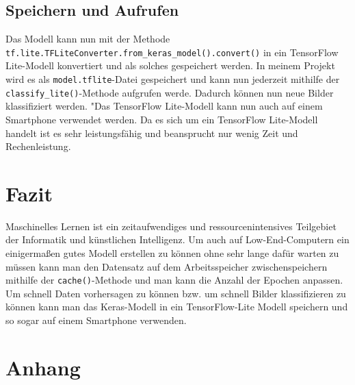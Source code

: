\documentclass[11pt,oneside]{report}
\begin{document}
\section{Speichern und Aufrufen}
Das Modell kann nun mit der Methode \verb+tf.lite.TFLiteConverter.from_keras_model().convert()+ in ein TensorFlow Lite-Modell konvertiert und als solches gespeichert werden. In meinem Projekt wird es als \verb+model.tflite+-Datei gespeichert und kann nun jederzeit mithilfe der \verb+classify_lite()+-Methode aufgrufen werde. Dadurch können nun neue Bilder klassifiziert werden. "Das TensorFlow Lite-Modell kann nun auch auf einem Smartphone verwendet werden. Da es sich um ein TensorFlow Lite-Modell handelt ist es sehr leistungsfähig und beansprucht nur wenig Zeit und Rechenleistung.


\chapter{Fazit}
Maschinelles Lernen ist ein zeitaufwendiges und ressourcenintensives Teilgebiet der Informatik und künstlichen Intelligenz. Um auch auf Low-End-Computern ein einigermaßen gutes Modell erstellen zu können ohne sehr lange dafür warten zu müssen kann man den Datensatz auf dem Arbeitsspeicher zwischenspeichern mithilfe der \verb+cache()+-Methode 
und man kann die Anzahl der Epochen anpassen. Um schnell Daten vorhersagen zu können bzw. um schnell Bilder klassifizieren zu können kann man das Keras-Modell in ein TensorFlow-Lite Modell speichern und so sogar auf einem Smartphone verwenden.


\appendix
\chapter{Anhang}


\lstset{style=code}
\end{document}
